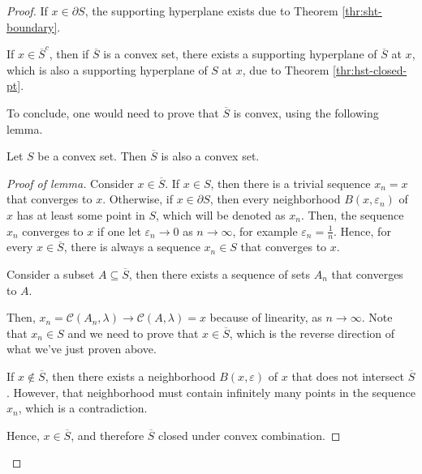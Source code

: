 \begin{proof}
  If \( x \in \partial S \), the supporting hyperplane exists due to Theorem
  \ref{thr:sht-boundary}.

  If \( x \in \overline{S}^{c} \), then if \(\overline{S} \) is a convex set,
  there exists a supporting hyperplane of \( \overline{S} \) at \( x \), which
  is also a supporting hyperplane of \( S \) at \( x \), due to Theorem
  \ref{thr:hst-closed-pt}.

  To conclude, one would need to prove that \( \overline{S} \) is convex, using
  the following lemma.
  \begin{lemma}
    Let \( S \) be a convex set. Then \( \overline{S} \) is also a convex set.
  \end{lemma}

  \begin{proof}[Proof of lemma]
    Consider \( x \in \overline{S} \). If \( x \in S \), then there is a trivial
    sequence \( x_{n} = x \) that converges to \( x \). Otherwise, if \( x \in
    \partial S \), then every neighborhood \( B(x, \varepsilon_{n}) \) of \( x
    \) has at least some point in \( S \), which will be denoted as \( x_{n} \).
    Then, the sequence \( x_{n} \) converges to \( x \) if one let \(
    \varepsilon_{n} \to  0 \) as \( n \to  \infty \), for example \(
    \varepsilon_{n} = \frac{1}{n} \). Hence, for every \( x \in \overline{S} \),
    there is always a sequence \( x_{n} \in S \) that converges to \( x \).

    Consider a subset \( A \subseteq \overline{S} \), then there exists a
    sequence of sets \( A_{n} \) that converges to \( A \).

    Then, \( x_{n} = \mathcal{C}(A_{n}, \lambda) \to  \mathcal{C}(A, \lambda) =
    x\) because of linearity, as \( n \to  \infty \). Note that \( x_{n} \in S
    \) and we need to prove that \( x \in \overline{S} \), which is the reverse
    direction of what we've just proven above.

    If \( x \notin \overline{S} \), then there exists a neighborhood \( B(x,
    \varepsilon) \) of \( x \) that does not intersect \( \overline{S} \).
    However, that neighborhood must contain infinitely many points in the
    sequence \( x_{n} \), which is a contradiction.

    Hence, \( x \in \overline{S} \), and therefore \( \overline{S} \) closed
    under convex combination.
  \end{proof}
\end{proof}

